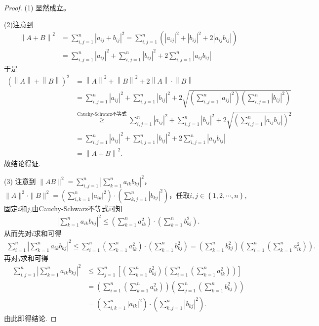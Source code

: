 \documentclass[../../main.tex]{subfiles}%
\begin{document}
\begin{proof}
(1) 显然成立。

(2)注意到
\begin{align*}
\left\| A+B \right\| ^2&=\sum_{i,j=1}^n{\left| a_{ij}+b_{ij} \right|^2}=\sum_{i,j=1}^n{\left( \left| a_{ij} \right|^2+\left| b_{ij} \right|^2+2\left| a_{ij}b_{ij} \right| \right)}\\
&=\sum_{i,j=1}^n{\left| a_{ij} \right|^2}+\sum_{i,j=1}^n{\left| b_{ij} \right|^2}+2\sum_{i,j=1}^n{\left| a_{ij}b_{ij} \right|}
\end{align*}
于是
\begin{align*}
\left( \left\| A \right\| +\left\| B \right\| \right) ^2&=\left\| A \right\| ^2+\left\| B \right\| ^2+2\left\| A \right\| \cdot \left\| B \right\| \\
&=\sum_{i,j=1}^n{\left| a_{ij} \right|^2}+\sum_{i,j=1}^n{\left| b_{ij} \right|^2}+2\sqrt{\left( \sum_{i,j=1}^n{\left| a_{ij} \right|^2} \right) \left( \sum_{i,j=1}^n{\left| b_{ij} \right|^2} \right)}\\
&\overset{\text{Cauchy-Schwarz不等式}}{\geqslant}\sum_{i,j=1}^n{\left| a_{ij} \right|^2}+\sum_{i,j=1}^n{\left| b_{ij} \right|^2}+2\sqrt{\left( \sum_{i,j=1}^n{\left| a_{ij}b_{ij} \right|} \right) ^2}\\
&=\sum_{i,j=1}^n{\left| a_{ij} \right|^2}+\sum_{i,j=1}^n{\left| b_{ij} \right|^2}+2\sum_{i,j=1}^n{\left| a_{ij}b_{ij} \right|}\\
&=\left\| A+B \right\| ^2.
\end{align*}
故结论得证.

(3) 注意到 $\|AB\|^2 = \sum_{i,j = 1}^{n}\left|\sum_{k = 1}^{n}a_{ik}b_{kj}\right|^2$，$\|A\|^2\cdot\|B\|^2 = \left(\sum_{i,k = 1}^{n}|a_{ik}|^2\right)\cdot\left(\sum_{k,j = 1}^{n}|b_{kj}|^2\right)$，任取$i,j\in \left\{ 1,2,\cdots ,n \right\}$,固定$i$和$j$,由Cauchy-Schwarz不等式可知
\begin{align*}
\left| \sum_{k=1}^n{a_{ik}b_{kj}} \right|^2\leqslant \left( \sum_{k=1}^n{a_{ik}^{2}} \right) \cdot \left( \sum_{k=1}^n{b_{kj}^{2}} \right) .
\end{align*}
从而先对$i$求和可得
\begin{align*}
\sum_{i=1}^n{\left| \sum_{k=1}^n{a_{ik}b_{kj}} \right|^2}\leqslant \sum_{i=1}^n{\left( \sum_{k=1}^n{a_{ik}^{2}} \right) \cdot \left( \sum_{k=1}^n{b_{kj}^{2}} \right)}=\left( \sum_{k=1}^n{b_{kj}^{2}} \right) \left( \sum_{i=1}^n{\left( \sum_{k=1}^n{a_{ik}^{2}} \right)} \right) .
\end{align*}
再对$j$求和可得
\begin{align*}
\sum_{i,j=1}^n{\left| \sum_{k=1}^n{a_{ik}b_{kj}} \right|^2}&\leqslant \sum_{j=1}^n{\left[ \left( \sum_{k=1}^n{b_{kj}^{2}} \right) \left( \sum_{i=1}^n{\left( \sum_{k=1}^n{a_{ik}^{2}} \right)} \right) \right]}\\
&=\left( \sum_{i=1}^n{\left( \sum_{k=1}^n{a_{ik}^{2}} \right)} \right) \left( \sum_{j=1}^n{\left( \sum_{k=1}^n{b_{kj}^{2}} \right)} \right) \\
&=\left( \sum_{i,k=1}^n{|a_{ik}|^2} \right) \cdot \left( \sum_{k,j=1}^n{|b_{kj}|^2} \right) .
\end{align*}
由此即得结论.
\end{proof}
\end{document}
